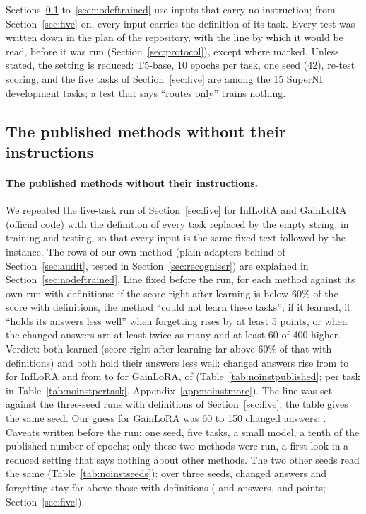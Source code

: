 Sections~\ref{sec:nodefpublished} to~\ref{sec:nodeftrained} use inputs that carry no instruction; from Section~\ref{sec:five} on, every input carries the definition of its task. Every test was written down in the plan of the repository, with the line by which it would be read, before it was run (Section~\ref{sec:protocol}), except where marked. Unless stated, the setting is reduced: T5-base, 10 epochs per task, one seed (42), re-test scoring, and the five tasks of Section~\ref{sec:five} are among the 15 SuperNI development tasks; a test that says ``routes only'' trains nothing.

\subsection{The published methods without their instructions}
\label{sec:nodefpublished}

\paragraph{The published methods without their instructions.} We repeated the five-task run of Section~\ref{sec:five} for InfLoRA and GainLoRA (official code) with the definition of every task replaced by the empty string, in training and testing, so that every input is the same fixed text followed by the instance. The rows of our own method (plain adapters behind \recog{} of Section~\ref{sec:audit}, tested in Section~\ref{sec:recogniser}) are explained in Section~\ref{sec:nodeftrained}.
Line fixed before the run, for each method against its own run with definitions: if the score right after learning is below 60\% of the score with definitions, the method ``could not learn these tasks''; if it learned, it ``holds its answers less well'' when forgetting rises by at least 5 points, or when the changed answers are at least twice as many and at least 60 of 400 higher. Verdict: both learned (score right after learning far above 60\% of that with definitions) and both hold their answers less well: changed answers rise from \AudPubInfloraDefChanged{} to \AudPubInfloraNoDefChanged{} for InfLoRA and from \AudPubGainloraDefChanged{} to \AudPubGainloraNoDefChanged{} for GainLoRA, of \AudPubCompared{} (Table~\ref{tab:noinstpublished}; per task in Table~\ref{tab:noinstpertask}, Appendix~\ref{app:noinstmore}).
The line was set against the three-seed runs with definitions of Section~\ref{sec:five}; the table gives the same seed. Our guess for GainLoRA was 60 to 150 changed answers: \AudPubGainloraNoDefChanged{}.
Caveats written before the run: one seed, five tasks, a small model, a tenth of the published number of epochs; only these two methods were run, a first look in a reduced setting that says nothing about other methods. The two other seeds read the same (Table~\ref{tab:noinstseeds}): over three seeds, changed answers and forgetting stay far above those with definitions (\FiveInfChanged{} and \FiveGainChanged{} answers, \FiveInfFT{} and \FiveGainFT{} points; Section~\ref{sec:five}).

